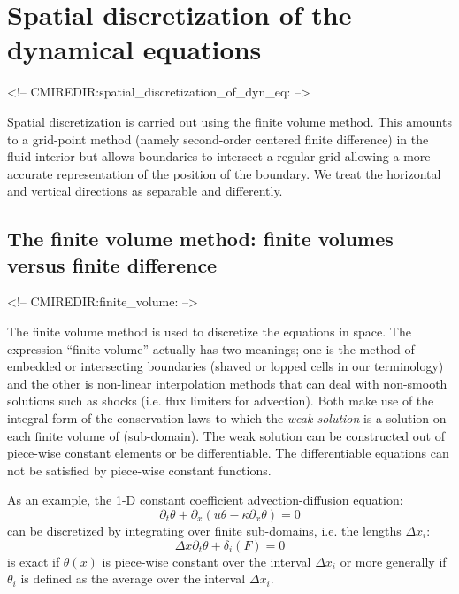 
\section{Spatial discretization of the dynamical equations}
\begin{rawhtml}
<!-- CMIREDIR:spatial_discretization_of_dyn_eq: -->
\end{rawhtml}

Spatial discretization is carried out using the finite volume
method. This amounts to a grid-point method (namely second-order
centered finite difference) in the fluid interior but allows
boundaries to intersect a regular grid allowing a more accurate
representation of the position of the boundary. We treat the
horizontal and vertical directions as separable and differently.


\subsection{The finite volume method: finite volumes versus finite difference}
\begin{rawhtml}
<!-- CMIREDIR:finite_volume: -->
\end{rawhtml}



The finite volume method is used to discretize the equations in
space. The expression ``finite volume'' actually has two meanings; one
is the method of embedded or intersecting boundaries (shaved or lopped
cells in our terminology) and the other is non-linear interpolation
methods that can deal with non-smooth solutions such as shocks
(i.e. flux limiters for advection). Both make use of the integral form
of the conservation laws to which the {\it weak solution} is a
solution on each finite volume of (sub-domain). The weak solution can
be constructed out of piece-wise constant elements or be
differentiable. The differentiable equations can not be satisfied by
piece-wise constant functions.

As an example, the 1-D constant coefficient advection-diffusion
equation:
\begin{displaymath}
\partial_t \theta + \partial_x ( u \theta - \kappa \partial_x \theta ) = 0
\end{displaymath}
can be discretized by integrating over finite sub-domains, i.e.
the lengths $\Delta x_i$:
\begin{displaymath}
\Delta x \partial_t \theta + \delta_i ( F ) = 0
\end{displaymath}
is exact if $\theta(x)$ is piece-wise constant over the interval
$\Delta x_i$ or more generally if $\theta_i$ is defined as the average
over the interval $\Delta x_i$.

